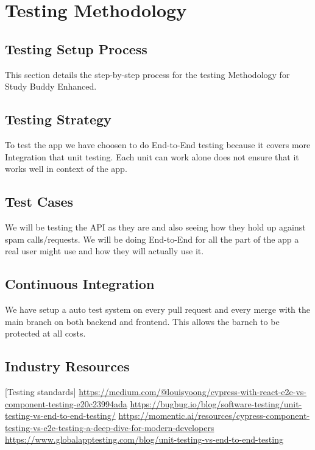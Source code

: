 \chapter{Testing Methodology}

\section{Testing Setup Process}
\label{sec:testing_setup}

This section details the step-by-step process for the testing Methodology for Study Buddy Enhanced.

\section{Testing Strategy}
To test the app we have choosen to do End-to-End testing because it covers more Integration that unit testing. Each unit can work alone does not ensure that it works well in context of the app.

\section{Test Cases}
We will be testing the API as they are and also seeing how they hold up against spam calls/requests. We will be doing End-to-End for all the part of the app a real user might use and how they will actually use it.

\section{Continuous Integration}
We have setup a auto test system on every pull request and every merge with the main branch on both backend and frontend. This allows the barnch to be protected at all costs.

\section{Industry Resources}
[Testing standards]
\url{https://medium.com/@louisyoong/cypress-with-react-e2e-vs-component-testing-e20c23994ada}
\url{https://bugbug.io/blog/software-testing/unit-testing-vs-end-to-end-testing/}
\url{https://momentic.ai/resources/cypress-component-testing-vs-e2e-testing-a-deep-dive-for-modern-developers}
\url{https://www.globalapptesting.com/blog/unit-testing-vs-end-to-end-testing}
 